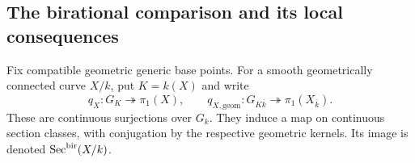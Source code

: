 \subsection{The birational comparison and its local consequences}

Fix compatible geometric generic base points.  For a smooth geometrically
connected curve $X/k$, put $K=k(X)$ and write
\[
 q_X:G_K\twoheadrightarrow\pi_1(X),\qquad
 q_{X,\mathrm{geom}}:G_{K\bar k}\twoheadrightarrow\pi_1(X_{\bar k}).
\]
These are continuous surjections over $G_k$.  They induce a map on
continuous section classes, with conjugation by the respective geometric
kernels.  Its image is denoted $\operatorname{Sec}^{\mathrm{bir}}(X/k)$.

